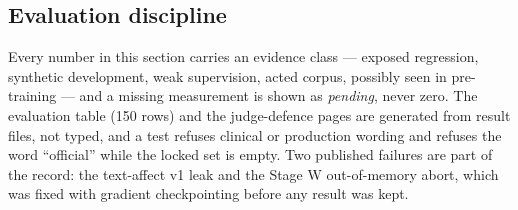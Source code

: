 \subsection{Evaluation discipline}
Every number in this section carries an evidence class --- exposed regression, synthetic development,
weak supervision, acted corpus, possibly seen in pre-training --- and a missing measurement is shown as
\emph{pending}, never zero. The evaluation table (150 rows) and the judge-defence pages are generated
from result files, not typed, and a test refuses clinical or production wording and refuses the word
``official'' while the locked set is empty. Two published failures are part of the record: the
text-affect v1 leak and the Stage W out-of-memory abort, which was fixed with gradient checkpointing
before any result was kept.
